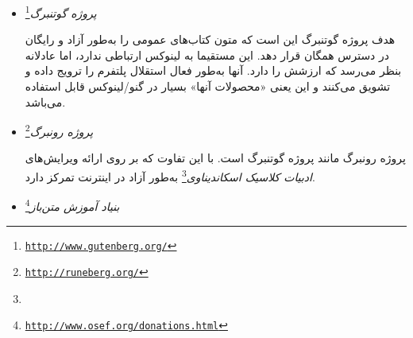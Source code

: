 \begin{itemize}
برای انجام کمک‌های مالی می‌توانید از مشخصات زیر استفاده کنید:
\begin{latin}
\begin{tscreen}
\begin{verbatim}
TeX Users Group
c/o Robin Laakso, executive director
TeX Users Group
PO Box 2311
Portland, OR 97208-2311
\end{verbatim}
\end{tscreen}
\end{latin}

و یا به‌جای آن به‌صورت آنلاین به
\emph{صحفه کمک‌های مالی انجن تاگ}\footnote{\texttt{\url{https://www.tug.org/donate.html}}}
مراجعه کنید.

\item
\emph{پروژه گوتنبرگ}\footnote{\texttt{\url{http://www.gutenberg.org/}}}

هدف پروژه گوتنبرگ این است که متون کتاب‌های عمومی را به‌طور آزاد و رایگان
در دسترس همگان قرار دهد. این مستقیما به لینوکس ارتباطی ندارد، اما عادلانه
بنظر می‌رسد که ارزشش را دارد. آنها به‌طور فعال استقلال پلتفرم را ترویج داده
و تشویق می‌کنند و این یعنی «محصولات آنها» بسیار در گنو/لینوکس قابل استفاده می‌باشد.



\item
\emph{پروژه رونبرگ}\footnote{\texttt{\url{http://runeberg.org/}}}

پروژه رونبرگ مانند پروژه گوتنبرگ است. با این تفاوت که بر روی
ارائه ویرایش‌های
\emph{ادبیات کلاسیک اسکاندیناوی}\footnote{}
به‌طور آزاد در اینترنت تمرکز دارد.

% 

\item
\emph{بنیاد آموزش متن‌باز}\footnote{\texttt{\url{http://www.osef.org/donations.html}}}




\end{itemize}
